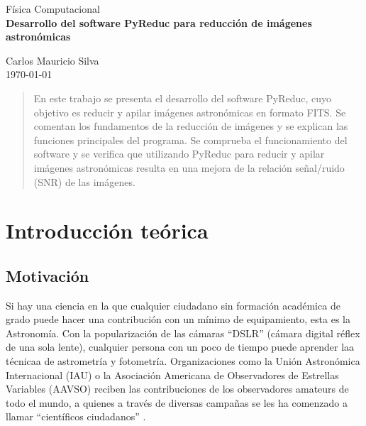 \documentclass[a4paper, 12pt]{article}
\begin{document}
\begin{titlepage}
\vspace{0.5cm}

\begin{center}
\normalsize{\sc Física Computacional}\\
\vspace{0.5cm}
\Large{\bf Desarrollo del software PyReduc para reducción de imágenes astronómicas}\\


\vspace{5cm}

\normalsize
Carlos Mauricio Silva\\

\vspace*{0.5cm}
\small{\today}

\vspace*{3cm}

\begin{abstract}
  En este trabajo se presenta el desarrollo del software PyReduc, cuyo objetivo es reducir y apilar imágenes astronómicas en formato FITS. Se comentan los fundamentos de la reducción de imágenes y se explican las funciones principales del programa. Se comprueba el funcionamiento del software y se verifica que utilizando PyReduc para reducir y apilar imágenes astronómicas resulta en una mejora de la relación señal/ruido (SNR) de las imágenes.
\end{abstract}

\vspace{5cm}

\normalsize

\end{center}
\end{titlepage}


\pagestyle{fancy}
\renewcommand{\footrulewidth}{0.6pt}

\tableofcontents
\newpage

\section{Introducción teórica}
\subsection{Motivación}
Si hay una ciencia en la que cualquier ciudadano sin formación académica de grado puede hacer una contribución con un mínimo de equipamiento, esta es la Astronomía. Con la popularización de las cámaras ``DSLR'' (cámara digital réflex de una sola lente), cualquier persona con un poco de tiempo puede aprender laa técnicaa de astrometría y fotometría. Organizaciones como la Unión Astronómica Internacional (IAU) o la Asociación Americana de Observadores de Estrellas Variables (AAVSO) reciben las contribuciones de los observadores amateurs de todo el mundo, a quienes a través de diversas campañas se les ha comenzado a llamar ``científicos ciudadanos'' \cite{aavso}.
\end{document}
